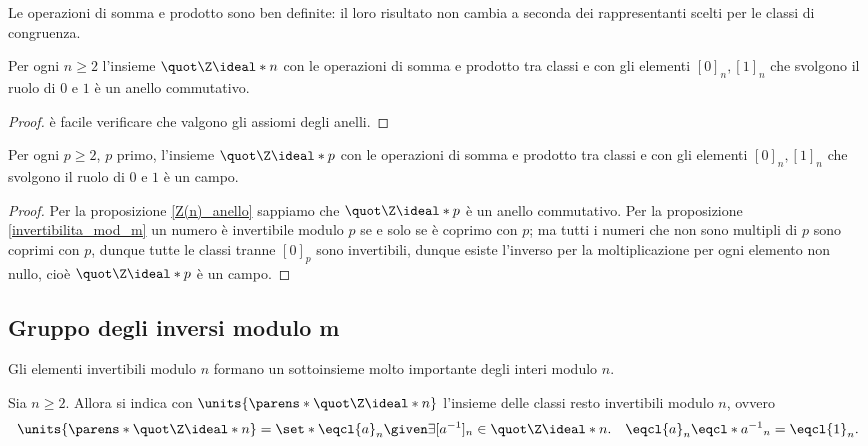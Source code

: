 \begin{remark}
    Le operazioni di somma e prodotto sono ben definite: il loro risultato non cambia a seconda dei rappresentanti scelti per le classi di congruenza.
\end{remark}

\begin{proposition}\label{Z(n)_anello}
    Per ogni $n \geq 2$ l'insieme $\Zmod{n}$ con le operazioni di somma e prodotto tra classi e con gli elementi $[0]_n, [1]_n$ che svolgono il ruolo di $0$ e $1$ è un anello commutativo.
\end{proposition}
\begin{proof}
    è facile verificare che valgono gli assiomi degli anelli.
\end{proof}

\begin{proposition}
    Per ogni $p \geq 2$, $p$ primo, l'insieme $\Zmod{p}$ con le operazioni di somma e prodotto tra classi e con gli elementi $[0]_n, [1]_n$ che svolgono il ruolo di $0$ e $1$ è un campo.
\end{proposition}
\begin{proof}
    Per la proposizione \ref{Z(n)_anello} sappiamo che $\Zmod{p}$ è un anello commutativo. Per la proposizione \ref{invertibilita_mod_m} un numero è invertibile modulo $p$ se e solo se è coprimo con $p$; ma tutti i numeri che non sono multipli di $p$ sono coprimi con $p$, dunque tutte le classi tranne $[0]_p$ sono invertibili, dunque esiste l'inverso per la moltiplicazione per ogni elemento non nullo, cioè $\Zmod{p}$ è un campo.
\end{proof}

\subsection*{Gruppo degli inversi modulo m}

Gli elementi invertibili modulo $n$ formano un sottoinsieme molto importante degli interi modulo $n$.

\begin{definition}
    Sia $n \geq 2$. Allora si indica con $\units{\parens*{\Zmod{n}}}$ l'insieme delle classi resto invertibili modulo $n$, ovvero \begin{equation}
        \units{\parens*{\Zmod{n}}} = \set*{\eqcl{a}_n \given \exists [a^{-1}]_n \in \Zmod{n}. \quad \eqcl{a}_n\eqcl*{a^{-1}}_n = \eqcl{1}_n}.
    \end{equation} 
\end{definition}

